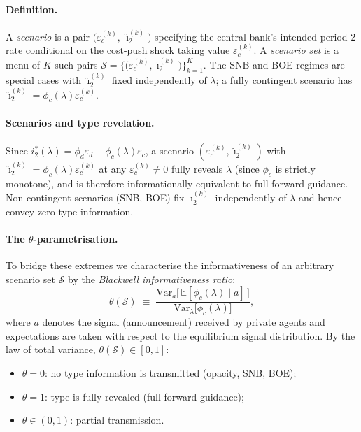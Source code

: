 \paragraph{Definition.}
A \emph{scenario} is a pair $\bigl(\varepsilon_c^{(k)},\, \hat{\imath}_2^{(k)}\bigr)$
specifying the central bank's intended period-2 rate conditional on the cost-push
shock taking value $\varepsilon_c^{(k)}$. A \emph{scenario set} is a menu of $K$
such pairs $\mathcal{S} = \bigl\{\bigl(\varepsilon_c^{(k)},\hat{\imath}_2^{(k)}\bigr)
\bigr\}_{k=1}^{K}$. The SNB and BOE regimes are special cases with $\hat{\imath}_2^{(k)}$
fixed independently of $\lambda$; a fully contingent scenario has
$\hat{\imath}_2^{(k)} = \phi_c(\lambda)\varepsilon_c^{(k)}$.

\paragraph{Scenarios and type revelation.}
Since $i_2^*(\lambda) = \phi_d\varepsilon_d + \phi_c(\lambda)\varepsilon_c$, a
scenario $(\varepsilon_c^{(k)},\hat{\imath}_2^{(k)})$ with
$\hat{\imath}_2^{(k)} = \phi_c(\lambda)\varepsilon_c^{(k)}$ at any
$\varepsilon_c^{(k)} \neq 0$ fully reveals $\lambda$ (since $\phi_c$ is strictly
monotone), and is therefore informationally equivalent to full forward guidance.
Non-contingent scenarios (SNB, BOE) fix $\hat{\imath}_2^{(k)}$ independently of
$\lambda$ and hence convey zero type information.

\paragraph{The $\theta$-parametrisation.}
To bridge these extremes we characterise the informativeness of an arbitrary scenario
set $\mathcal{S}$ by the \emph{Blackwell informativeness ratio}:
\begin{equation}
  \theta(\mathcal{S})
  \;\equiv\;
  \frac{\mathrm{Var}_a\bigl[\,\mathbb{E}[\phi_c(\lambda)\mid a]\,\bigr]}
       {\mathrm{Var}_\lambda\bigl[\phi_c(\lambda)\bigr]},
  \label{eq:theta_def}
\end{equation}
where $a$ denotes the signal (announcement) received by private agents and
expectations are taken with respect to the equilibrium signal distribution. By the
law of total variance, $\theta(\mathcal{S}) \in [0,1]$:
\begin{itemize}
  \item $\theta = 0$: no type information is transmitted (opacity, SNB, BOE);
  \item $\theta = 1$: type is fully revealed (full forward guidance);
  \item $\theta \in (0,1)$: partial transmission.
\end{itemize}

